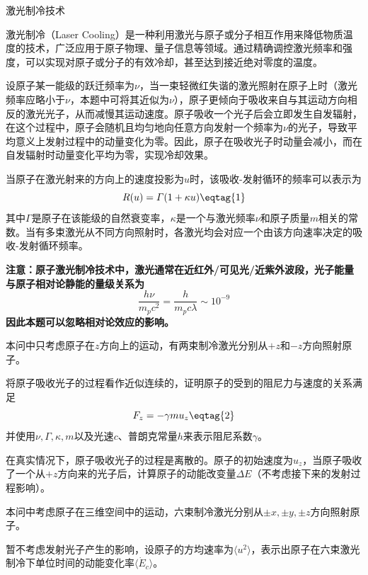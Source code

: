 \documentclass[answer]{cphos}
\begin{document}
\begin{problem}[40]{激光制冷技术}

\begin{problemstatement}
激光制冷（Laser Cooling）是一种利用激光与原子或分子相互作用来降低物质温度的技术，广泛应用于原子物理、量子信息等领域。通过精确调控激光频率和强度，可以实现对原子或分子的有效冷却，甚至达到接近绝对零度的温度。

设原子某一能级的跃迁频率为$\nu$，当一束轻微红失谐的激光照射在原子上时（激光频率应略小于$\nu$，本题中可将其近似为$\nu$），原子更倾向于吸收来自与其运动方向相反的激光光子，从而减慢其运动速度。原子吸收一个光子后会立即发生自发辐射，在这个过程中，原子会随机且均匀地向任意方向发射一个频率为$\nu$的光子，导致平均意义上发射过程中的动量变化为零。因此，原子在吸收光子时动量会减小，而在自发辐射时动量变化平均为零，实现冷却效果。

当原子在激光射来的方向上的速度投影为$u$时，该吸收-发射循环的频率可以表示为
\begin{equation}
    R(u) = \varGamma(1+\kappa u) \eqtag{1}
\end{equation}
其中$\varGamma$是原子在该能级的自然衰变率，$\kappa$是一个与激光频率$\nu$和原子质量$m$相关的常数。当有多束激光从不同方向照射时，各激光均会对应一个由该方向速率决定的吸收-发射循环频率。

\vspace{1em}
\noindent\textbf{注意：原子激光制冷技术中，激光通常在近红外/可见光/近紫外波段，光子能量与原子相对论静能的量级关系为}
$$
\frac{h\nu}{m_pc^2}=\frac{h}{m_pc\lambda}\sim 10^{-9}
$$
\noindent\textbf{因此本题可以忽略相对论效应的影响。}

\vspace{1em}
 本问中只考虑原子在$z$方向上的运动，有两束制冷激光分别从$+z$和$-z$方向照射原子。

 将原子吸收光子的过程看作近似连续的，证明原子的受到的阻尼力与速度的关系满足
\begin{equation}
    F_z = -\gamma mu_z \eqtag{2}
\end{equation}
并使用$\nu,\varGamma,\kappa,m$以及光速$c$、普朗克常量$h$来表示阻尼系数$\gamma$。

 在真实情况下，原子吸收光子的过程是离散的。原子的初始速度为$u_z$，当原子吸收了一个从$+z$方向来的光子后，计算原子的动能改变量$\Delta E$（不考虑接下来的发射过程影响）。

 本问中考虑原子在三维空间中的运动，六束制冷激光分别从$\pm x,\pm y,\pm z$方向照射原子。

 暂不考虑发射光子产生的影响，设原子的方均速率为$\langle u^2 \rangle$，表示出原子在六束激光制冷下单位时间的动能变化率$\langle \dot{E}_c \rangle$。


\end{problemstatement}
\end{problem}
\end{document}
